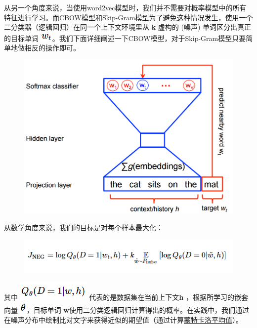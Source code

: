 从另一个角度来说，当使用word2vec模型时，我们并不需要对概率模型中的所有特征进行学习。而CBOW模型和Skip-Gram模型为了避免这种情况发生，使用一个二分类器（逻辑回归）在同一个上下文环境里从
\textbf{k} 虚构的 (噪声) 单词区分出真正的目标单词
\includegraphics{../SOURCE/images/rw4.png}。我们下面详细阐述一下CBOW模型，对于Skip-Gram模型只要简单地做相反的操作即可。

\begin{figure}[htbp]
\centering
\includegraphics[width=.75\textwidth]{../SOURCE/images/softmax-nplm.png}
\caption{}
\end{figure}

从数学角度来说，我们的目标是对每个样本最大化：

\begin{figure}[htbp]
\centering
\includegraphics{../SOURCE/images/rw6.png}
\caption{}
\end{figure}

其中 \includegraphics{../SOURCE/images/rw7.png} 代表的是数据集在当前上下文\textbf{h} ，根据所学习的嵌套向量 \includegraphics{../SOURCE/images/theta.png}，目标单词 \textbf{w}使用二分类逻辑回归计算得出的概率。在实践中，我们通过在噪声分布中绘制比对文字来获得近似的期望值（通过计算\href{https://en.wikipedia.org/wiki/Monte_Carlo_integration}{蒙特卡洛平均值}）。

